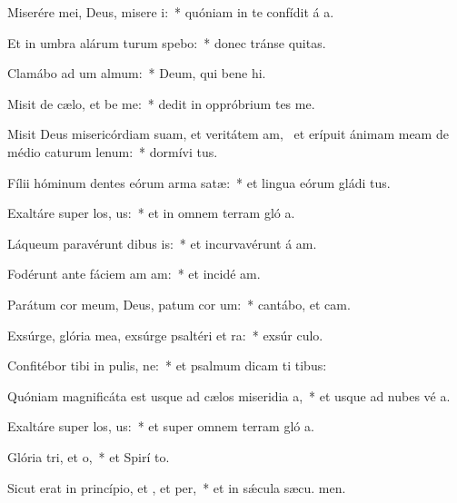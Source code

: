 \item Miserére mei, Deus, misere i:~* quóniam in te confídit á a.
\item Et in umbra alárum turum spebo:~* donec tránse quitas.
\item Clamábo ad um almum:~* Deum, qui bene hi.
\item Misit de cælo, et be me:~* dedit in oppróbrium tes me.
\item Misit Deus misericórdiam suam, et veritátem am,~\pscross{} et erípuit ánimam meam de médio caturum lenum:~* dormívi tus.
\item Fílii hóminum dentes eórum arma  satæ:~* et lingua eórum gládi tus.
\item Exaltáre super los, us:~* et in omnem terram gló a.
\item Láqueum paravérunt dibus is:~* et incurvavérunt á am.
\item Fodérunt ante fáciem am am:~* et incidé  am.
\item Parátum cor meum, Deus, patum cor um:~* cantábo, et  cam.
\item Exsúrge, glória mea, exsúrge psaltéri et ra:~* exsúr culo.
\item Confitébor tibi in pulis, ne:~* et psalmum dicam ti  tibus:
\item Quóniam magnificáta est usque ad cælos miseridia a,~* et usque ad nubes vé a.
\item Exaltáre super los, us:~* et super omnem terram gló a.
\item Glória tri, et o,~* et Spirí to.
\item Sicut erat in princípio, et , et per,~* et in sǽcula sæcu. men.
